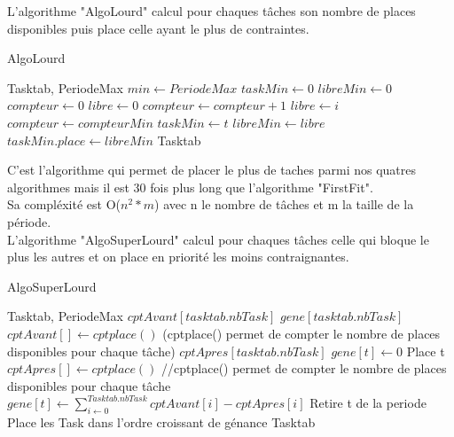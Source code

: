 \documentclass[11pt]{article}
\begin{document}
\newpage
L'algorithme "AlgoLourd" calcul pour chaques tâches son nombre de places disponibles puis place celle ayant le plus de contraintes.\\
\begin{algorithm}
    \caption{AlgoLourd}
    \begin{algorithmic}
    \REQUIRE Tasktab, PeriodeMax
    \STATE $min \leftarrow PeriodeMax$
    \STATE $taskMin \leftarrow 0$
    \STATE $libreMin \leftarrow 0$
        \STATE $compteur \leftarrow 0$
        \STATE $libre \leftarrow 0$
                    \STATE $compteur \leftarrow compteur + 1$
                    \STATE $libre \leftarrow i$
                \ENDIF
            \ENDFOR
                \STATE $compteur \leftarrow compteurMin$
                \STATE $taskMin \leftarrow t$
                \STATE $libreMin \leftarrow libre$
            \ENDIF
        \ENDFOR
        \STATE $taskMin.place \leftarrow libreMin$
    \ENDFOR
    \RETURN Tasktab
    \end{algorithmic}
\end{algorithm}

C'est l'algorithme qui permet de placer le plus de taches parmi nos quatres algorithmes mais il est 30 fois plus long que l'algorithme "FirstFit".\\
Sa compléxité est O($n^2*m$) avec n le nombre de tâches et m la taille de la période.\\ 

\newpage
L'algorithme "AlgoSuperLourd" calcul pour chaques tâches celle qui bloque le plus les autres et on place en priorité les moins contraignantes.\\
\begin{algorithm}
    \caption{AlgoSuperLourd}
    \begin{algorithmic}
    \REQUIRE Tasktab, PeriodeMax
    \STATE $cptAvant[tasktab.nbTask]$
    \STATE $gene[tasktab.nbTask]$
        \STATE $cptAvant[] \leftarrow cptplace()$ (cptplace() permet de compter le nombre de places disponibles pour chaque tâche)
        \STATE $cptApres[tasktab.nbTask]$
            \STATE $gene[t] \leftarrow 0$
                    \STATE Place t
                \ENDIF
            \ENDFOR
            \STATE $cptApres[] \leftarrow cptplace()$ //cptplace() permet de compter le nombre de places disponibles pour chaque tâche
            \STATE $gene[t] \leftarrow \sum\limits_{i\leftarrow0}^{Tasktab.nbTask} cptAvant[i] - cptApres[i]$
            \STATE Retire t de la periode
        \ENDFOR
        \STATE Place les Task dans l'ordre croissant de génance
    \ENDFOR
    \RETURN Tasktab
    \end{algorithmic}
\end{algorithm}
\end{document}
